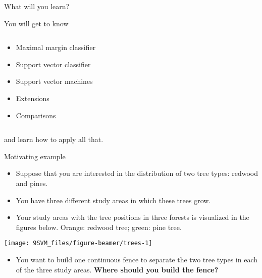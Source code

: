 \documentclass[10pt,ignorenonframetext,]{beamer}
\providecommand{\tightlist}{%
  \setlength{\itemsep}{0pt}\setlength{\parskip}{0pt}}
\begin{document}
\begin{frame}

\begin{block}{What will you learn?}

\vspace{2mm}

You will get to know

\(~\)

\begin{itemize}
\tightlist
\item
  Maximal margin classifier
\item
  Support vector classifier
\item
  Support vector machines
\item
  Extensions
\item
  Comparisons
\end{itemize}

\(~\)

and learn how to apply all that.

\end{block}

\end{frame}

\begin{frame}

\begin{block}{Motivating example}

\vspace{2mm}

\begin{itemize}
\item
  Suppose that you are interested in the distribution of two tree types:
  redwood and pines.
\item
  You have three different study areas in which these trees grow.
\item
  Your study areas with the tree positions in three forests is
  visualized in the figures below. Orange: redwood tree; green: pine
  tree.
\end{itemize}

\begin{center}\texttt{[image: 9SVM\_files/figure-beamer/trees-1]} \end{center}

\vspace{0mm}

\begin{itemize}
\tightlist
\item
  You want to build one continuous fence to separate the two tree types
  in each of the three study areas. \textbf{Where should you build the
  fence?}
\end{itemize}

\end{block}

\end{frame}
\end{document}

